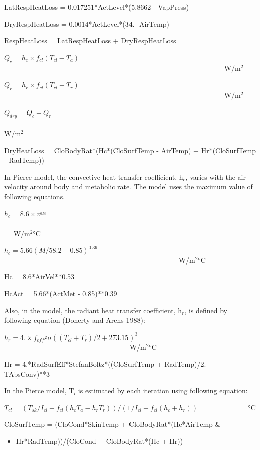 LatRespHeatLoss = 0.017251*ActLevel*(5.8662 - VapPress)

DryRespHeatLoss = 0.0014*ActLevel*(34.- AirTemp)

RespHeatLoss = LatRespHeatLoss + DryRespHeatLoss

\({Q_c} = {h_c} \times {f_{cl}}({T_{cl}} - {T_a})\) ~~~~~~~~~~~~~~~~~~~~~~~~~~~~~~~~~~~~~~~~~~~~~~~~~~~~~~~~~~~~~~ W/m\(^{2}\)

\({Q_r} = {h_r} \times {f_{cl}}({T_{cl}} - {T_r})\) ~~~~~~~~~~~~~~~~~~~~~~~~~~~~~~~~~~~~~~~~~~~~~~~~~~~~~~~~~~~~~~ W/m\(^{2}\)

\({Q_{dry}} = {Q_c} + {Q_r}\) ~~~~~~~~~~~~~~~~~~~~~~~~~~~~~~~~~~~~~~~~~~~~~~~~~~~~~~~~~~~~~~~~~~~~~~~~ W/m\(^{2}\)

DryHeatLoss = CloBodyRat*(Hc*(CloSurfTemp - AirTemp) + Hr*(CloSurfTemp - RadTemp))

In Pierce model, the convective heat transfer coefficient, h\(_{c}\), varies with the air velocity around body and metabolic rate. The model uses the maximum value of following equations.

\({h_c} = 8.6 \times {v^{_{0.53}}}\) ~~~~~~~~~~~~~~~~~~~~~~~~~~~~~~~~~~~~~~~~~~~~~~~~~~~~~~~~~~~~~~~~~~~~~~~~~~ W/m\(^{2}\)°C

\({h_c} = 5.66{(M/58.2 - 0.85)^{0.39}}\) ~~~~~~~~~~~~~~~~~~~~~~~~~~~~~~~~~~~~~~~~~~~~~~~~~ W/m\(^{2}\)°C

Hc = 8.6*AirVel**0.53

HcAct = 5.66*(ActMet - 0.85)**0.39

Also, in the model, the radiant heat transfer coefficient, h\(_{r}\), is defined by following equation (Doherty and Arens 1988):

\({h_r} = 4. \times {f_{eff}}\varepsilon \sigma {(({T_{cl}} + {T_r})/2 + 273.15)^3}\) ~~~~~~~~~~~~~~~~~~~~~~~~~~~~~~~~~~~ W/m\(^{2}\)°C

Hr = 4.*RadSurfEff*StefanBoltz*((CloSurfTemp + RadTemp)/2. + TAbsConv)**3

In the Pierce model, T\(_{l}\) is estimated by each iteration using following equation:

\({T_{cl}} = ({T_{sk}}/{I_{cl}} + {f_{cl}}({h_c}{T_a} - {h_r}{T_r}))/(1/{I_{cl}} + {f_{cl}}({h_c} + {h_r}))\) ~~~~~~~~~~~~~ °C

CloSurfTemp = (CloCond*SkinTemp + CloBodyRat*(Hc*AirTemp \&

\begin{itemize}
\tightlist
\item
  Hr*RadTemp))/(CloCond + CloBodyRat*(Hc + Hr))
\end{itemize}

